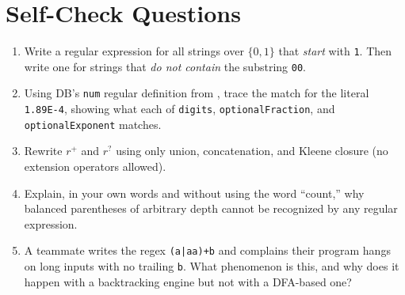 \documentclass[full-course-notes.tex]{subfiles}
\begin{document}
\section{Self-Check Questions}
\label{sec:l4-selfcheck}

\begin{enrichment}
\begin{enumerate}
  \item Write a regular expression for all strings over $\{0,1\}$ that \emph{start} with
  \texttt{1}. Then write one for strings that \emph{do not contain} the substring \texttt{00}.
  \item Using DB's \texttt{num} regular definition from ,
  trace the match for the literal \texttt{1.89E-4}, showing what each of \texttt{digits},
  \texttt{optionalFraction}, and \texttt{optionalExponent} matches.
  \item Rewrite $r^{+}$ and $r^{?}$ using only union, concatenation, and Kleene closure (no
  extension operators allowed).
  \item Explain, in your own words and without using the word ``count,'' why balanced
  parentheses of arbitrary depth cannot be recognized by any regular expression.
  \item A teammate writes the regex \texttt{(a|aa)+b} and complains their program hangs on long
  inputs with no trailing \texttt{b}. What phenomenon is this, and why does it happen with a
  backtracking engine but not with a DFA-based one?
\end{enumerate}
\end{enrichment}
\end{document}
